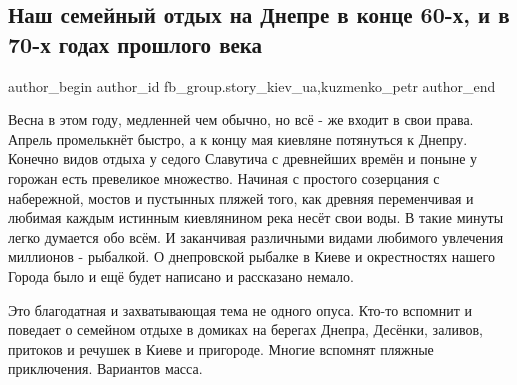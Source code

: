  
 
 
 
 
 
\subsection{Наш семейный отдых на Днепре в конце 60-х, и в 70-х годах прошлого века}
\label{sec:30_03_2021.fb.fb_group.story_kiev_ua.1.dnepr_semja_otdyh}
 
\ifcmt
 author_begin
   author_id fb_group.story_kiev_ua,kuzmenko_petr
 author_end
\fi

Весна в этом году, медленней чем обычно, но всё - же входит в свои права.
Апрель промелькнёт быстро, а к концу мая киевляне потянуться к Днепру. Конечно
видов отдыха у седого Славутича с древнейших времён и поныне у горожан есть
превеликое множество. Начиная с простого созерцания с набережной, мостов и
пустынных пляжей того, как древняя переменчивая и любимая каждым истинным
киевлянином река несёт свои воды. В такие минуты легко думается обо всём. И
заканчивая различными видами любимого увлечения миллионов - рыбалкой. О
днепровской рыбалке в Киеве и окрестностях нашего Города было и ещё будет
написано и рассказано немало. 

Это благодатная и захватывающая тема не одного опуса. Кто-то вспомнит и
поведает о семейном отдыхе в домиках на берегах Днепра, Десёнки, заливов,
притоков и речушек в Киеве и пригороде. Многие вспомнят пляжные приключения.
Вариантов масса. 

\begin{multicols}{2} %
\setlength{\parindent}{0pt}




\end{multicols} %

